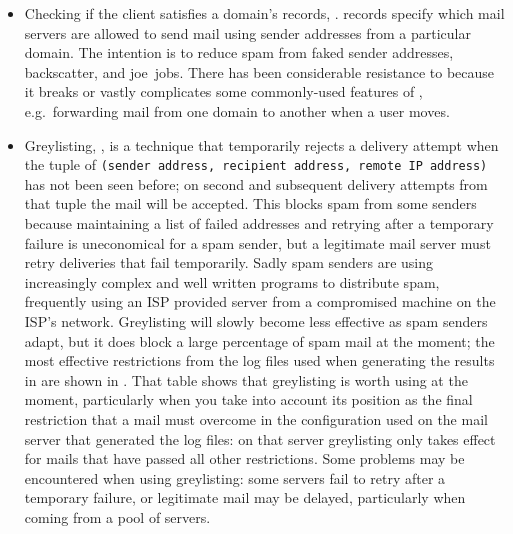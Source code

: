 \begin{itemize}

    \item Checking if the client satisfies a domain's 
        records, .
         records specify which mail servers are allowed to
        send mail using sender addresses from a particular domain.  The
        intention is to reduce spam from faked sender addresses,
        backscatter, and joe~jobs.
        There has been considerable resistance to  because it
        breaks or vastly complicates some commonly-used features of
        , e.g.\ forwarding mail from one domain to another
        when a user moves.

    \item Greylisting,
        , is a
        technique that temporarily rejects a delivery attempt when the
        tuple of \newline{} \tab{}\texttt{(sender address, recipient
        address, remote IP address)}\newline{} has not been seen before; on
        second and subsequent delivery attempts from that tuple the mail
        will be accepted.  This blocks spam from some senders because
        maintaining a list of failed addresses and retrying after a
        temporary failure is uneconomical for a spam sender, but a
        legitimate mail server must retry deliveries that fail temporarily.
        Sadly spam senders are using increasingly complex and well written
        programs to distribute spam, frequently using an ISP provided
         server from a compromised machine on the ISP's
        network.  Greylisting will slowly become less effective as spam
        senders adapt, but it does block a large percentage of spam mail at
        the moment; the most effective restrictions from the
        \numberOFlogFILES{} log files used when generating the results in
         are shown in .  That table shows that greylisting is worth using at
        the moment, particularly when you take into account its position as
        the final restriction that a mail must overcome in the
        configuration used on the mail server that generated the log files:
        on that server greylisting only takes effect for mails that have
        passed all other restrictions.  Some problems may be encountered
        when using greylisting: some servers fail to retry after a
        temporary failure, or legitimate mail may be delayed, particularly
        when coming from a pool of servers.


\end{itemize}
